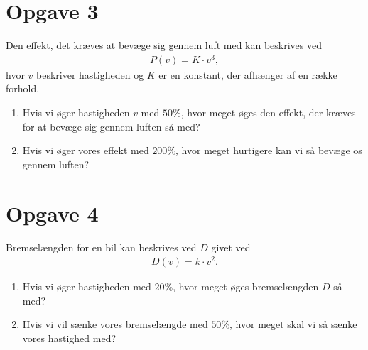 \section*{Opgave 3}
Den effekt, det kræves at bevæge sig gennem luft med kan beskrives ved 
\begin{align*}
P(v) = K\cdot v^3,
\end{align*}
hvor $v$ beskriver hastigheden og $K$ er en konstant, der afhænger af en række forhold.
\begin{enumerate}[label=\roman*)]
\item Hvis vi øger hastigheden $v$ med $50\%$, hvor meget øges den effekt, der kræves for at bevæge sig gennem luften så med? 
\item Hvis vi øger vores effekt med $200\%$, hvor meget hurtigere kan vi så bevæge os gennem luften?
\end{enumerate}
\section*{Opgave 4}
Bremselængden for en bil kan beskrives ved $D$ givet ved
\begin{align*}
D(v) = k\cdot v^2.
\end{align*}
\begin{enumerate}[label=\roman*)]
\item Hvis vi øger hastigheden med $20\%$, hvor meget øges bremselængden $D$ så med?
\item Hvis vi vil sænke vores bremselængde med $50\%$, hvor meget skal vi så sænke vores hastighed med?
\end{enumerate}